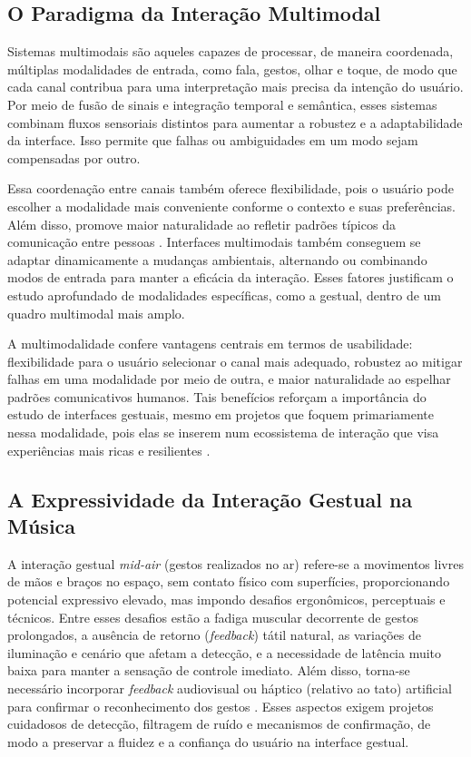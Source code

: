 \subsection{O Paradigma da Interação Multimodal}
\label{subsec:paradigma_iteracao_multimodal}

Sistemas multimodais são aqueles capazes de processar, de maneira coordenada, múltiplas modalidades de entrada, como fala, gestos, olhar e toque, de modo que cada canal contribua para uma interpretação mais precisa da intenção do usuário. Por meio de fusão de sinais e integração temporal e semântica, esses sistemas combinam fluxos sensoriais distintos para aumentar a robustez e a adaptabilidade da interface. Isso permite que falhas ou ambiguidades em um modo sejam compensadas por outro. 

Essa coordenação entre canais também oferece flexibilidade, pois o usuário pode escolher a modalidade mais conveniente conforme o contexto e suas preferências. Além disso, promove maior naturalidade ao refletir padrões típicos da comunicação entre pessoas \cite{oviatt2018multimodal2, oviatt2019multimodal3}. Interfaces multimodais também conseguem se adaptar dinamicamente a mudanças ambientais, alternando ou combinando modos de entrada para manter a eficácia da interação. Esses fatores justificam o estudo aprofundado de modalidades específicas, como a gestual, dentro de um quadro multimodal mais amplo.

A multimodalidade confere vantagens centrais em termos de usabilidade: flexibilidade para o usuário selecionar o canal mais adequado, robustez ao mitigar falhas em uma modalidade por meio de outra, e maior naturalidade ao espelhar padrões comunicativos humanos. Tais benefícios reforçam a importância do estudo de interfaces gestuais, mesmo em projetos que foquem primariamente nessa modalidade, pois elas se inserem num ecossistema de interação que visa experiências mais ricas e resilientes \cite{oviatt2019multimodal3}.

\subsection{A Expressividade da Interação Gestual na Música}
\label{subsec:expressividade_iteracao_gestual}

A interação gestual \textit{mid-air} (gestos realizados no ar) refere-se a movimentos livres de mãos e braços no espaço, sem contato físico com superfícies, proporcionando potencial expressivo elevado, mas impondo desafios ergonômicos, perceptuais e técnicos. Entre esses desafios estão a fadiga muscular decorrente de gestos prolongados, a ausência de retorno (\textit{feedback}) tátil natural, as variações de iluminação e cenário que afetam a detecção, e a necessidade de latência muito baixa para manter a sensação de controle imediato. Além disso, torna-se necessário incorporar \textit{feedback} audiovisual ou háptico (relativo ao tato) artificial para confirmar o reconhecimento dos gestos \cite{aigner2012understanding}. Esses aspectos exigem projetos cuidadosos de detecção, filtragem de ruído e mecanismos de confirmação, de modo a preservar a fluidez e a confiança do usuário na interface gestual.

